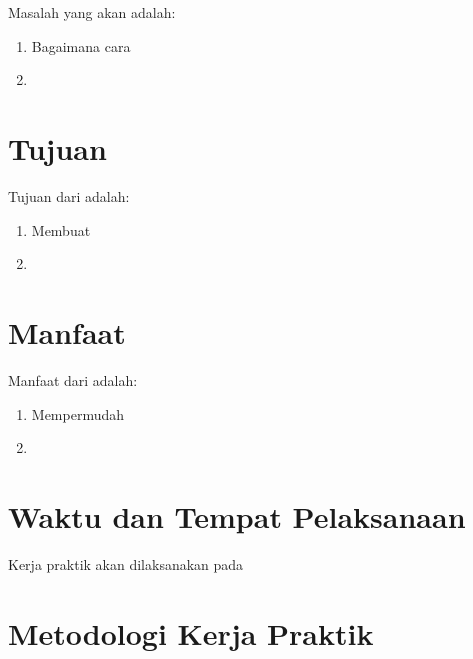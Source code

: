 \section{}

Masalah yang akan \lipsum[3][1-2] adalah:

\begin{enumerate}[nolistsep]

  \item Bagaimana cara \lipsum[3][3-5]

  \item \lipsum[3][6-8]

\end{enumerate}

\section{Tujuan}

Tujuan dari \lipsum[4][1-3] adalah:

\begin{enumerate}[nolistsep]

  \item Membuat \lipsum[4][4-5]

  \item \lipsum[4][6-9]

\end{enumerate}

\section{Manfaat}

Manfaat dari \lipsum[5][1-3] adalah:

\begin{enumerate}[nolistsep]

  \item Mempermudah \lipsum[5][4-5]

  \item \lipsum[5][6-10]

\end{enumerate}

\section{Waktu dan Tempat Pelaksanaan}

Kerja praktik akan dilaksanakan pada \lipsum[6][1-3]

\section{Metodologi Kerja Praktik}

